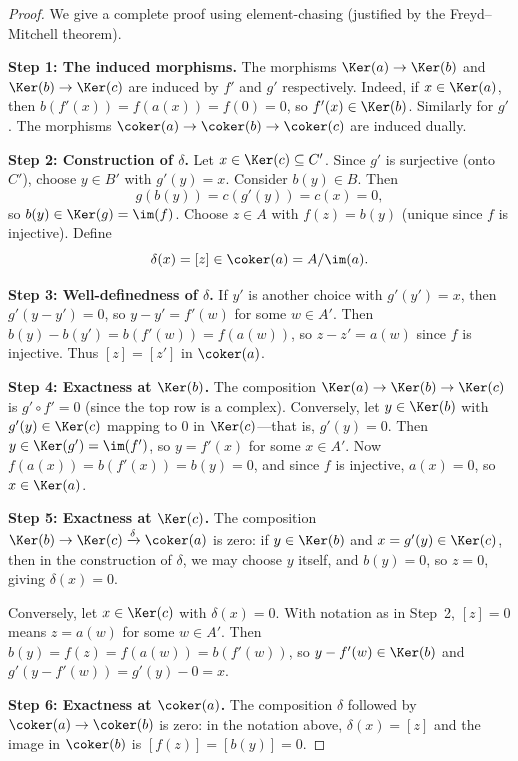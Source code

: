 \begin{proof}
We give a complete proof using element-chasing (justified by the Freyd--Mitchell theorem).

\medskip\noindent
\textbf{Step 1: The induced morphisms.}
The morphisms $\Ker(a) \to \Ker(b)$ and $\Ker(b) \to \Ker(c)$ are induced by $f'$ and $g'$
respectively. Indeed, if $x \in \Ker(a)$, then $b(f'(x)) = f(a(x)) = f(0) = 0$, so
$f'(x) \in \Ker(b)$. Similarly for $g'$. The morphisms $\coker(a) \to \coker(b) \to \coker(c)$
are induced dually.

\medskip\noindent
\textbf{Step 2: Construction of $\delta$.}
Let $x \in \Ker(c) \subseteq C'$. Since $g'$ is surjective (onto $C'$), choose
$y \in B'$ with $g'(y) = x$. Consider $b(y) \in B$. Then
\[
    g(b(y)) = c(g'(y)) = c(x) = 0,
\]
so $b(y) \in \Ker(g) = \im(f)$. Choose $z \in A$ with $f(z) = b(y)$ (unique since $f$
is injective). Define
\[
    \delta(x) = [z] \in \coker(a) = A / \im(a).
\]

\medskip\noindent
\textbf{Step 3: Well-definedness of $\delta$.}
If $y'$ is another choice with $g'(y') = x$, then $g'(y - y') = 0$, so $y - y' = f'(w)$
for some $w \in A'$. Then $b(y) - b(y') = b(f'(w)) = f(a(w))$, so $z - z' = a(w)$
since $f$ is injective. Thus $[z] = [z']$ in $\coker(a)$.

\medskip\noindent
\textbf{Step 4: Exactness at $\Ker(b)$.}
The composition $\Ker(a) \to \Ker(b) \to \Ker(c)$ is $g' \circ f' = 0$ (since the top
row is a complex). Conversely, let $y \in \Ker(b)$ with $g'(y) \in \Ker(c)$ mapping to $0$
in $\Ker(c)$---that is, $g'(y) = 0$. Then $y \in \Ker(g') = \im(f')$, so $y = f'(x)$
for some $x \in A'$. Now $f(a(x)) = b(f'(x)) = b(y) = 0$, and since $f$ is injective,
$a(x) = 0$, so $x \in \Ker(a)$.

\medskip\noindent
\textbf{Step 5: Exactness at $\Ker(c)$.}
The composition $\Ker(b) \to \Ker(c) \xrightarrow{\delta} \coker(a)$ is zero: if $y \in \Ker(b)$
and $x = g'(y) \in \Ker(c)$, then in the construction of $\delta$, we may choose $y$
itself, and $b(y) = 0$, so $z = 0$, giving $\delta(x) = 0$.

Conversely, let $x \in \Ker(c)$ with $\delta(x) = 0$. With notation as in Step~2,
$[z] = 0$ means $z = a(w)$ for some $w \in A'$. Then $b(y) = f(z) = f(a(w)) = b(f'(w))$,
so $y - f'(w) \in \Ker(b)$ and $g'(y - f'(w)) = g'(y) - 0 = x$.

\medskip\noindent
\textbf{Step 6: Exactness at $\coker(a)$.}
The composition $\delta$ followed by $\coker(a) \to \coker(b)$ is zero: in the
notation above, $\delta(x) = [z]$ and the image in $\coker(b)$ is $[f(z)] = [b(y)] = 0$.


\end{proof}
